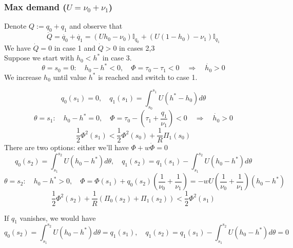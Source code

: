 \documentclass[12pt]{article}
\begin{document}

%

\newpage

\subsubsection*{Max demand ($U = \nu_0 + \nu_1$)}

Denote $ Q := q_0 + q_1 $ and observe that
$$ \dot{Q} = \dot{q_0} + \dot{q_1} = \left( Uh_0 - \nu_0 \right) \mathbb{I}_{q_0} +  \left( U(1-h_0) - \nu_1 \right) \mathbb{I}_{q_1} $$
We have $\dot{Q} = 0$ in case 1 and $ \dot{Q} > 0$ in cases 2,3
\\
Suppose we start with $h_0 < h^*$ in case 3. 
$$ \theta = s_0 = 0: \quad h_0 - h^* < 0, \quad \Phi = \tau_0 - \tau_1 < 0 \quad \Rightarrow \quad \dot{h_0} > 0 $$
We increase $h_0$ until value $h^*$ is reached and switch to case 1. 

$$ q_0(s_1) = 0, \quad q_1(s_1) = \int_{s_0}^{s_1}  U(h^*-h_0) d \theta $$
$$ \theta = s_1: \quad h_0 - h^* = 0, \quad \Phi = \tau_0 - (\tau_1 + \frac{q_1}{\nu_1}) < 0 \quad \Rightarrow \quad \dot{h_0} > 0 $$
$$ \frac{1}{2}\Phi^2(s_1) < \frac{1}{2}\Phi^2(s_0) + \frac{1}{R} \Pi_1(s_0) $$
There are two options: either we'll have $\Phi + w \dot{\Phi} = 0$
$$ q_0(s_2) = \int_{s_1}^{s_2} U(h_0 - h^*)d\theta, \quad q_1(s_2) = q_1(s_1) - \int_{s_1}^{s_2} U(h_0 - h^*)d\theta $$
$$ \theta = s_2: \quad h_0 - h^* > 0, \quad \Phi = \Phi(s_1) + q_0(s_2) \left(\frac{1}{\nu_0} + \frac{1}{\nu_1} \right) = -w U \left(\frac{1}{\nu_0} + \frac{1}{\nu_1} \right) (h_0 - h^*) $$
$$ \frac{1}{2}\Phi^2(s_2) + \frac{1}{R} (\Pi_0(s_2) + \Pi_1(s_2))  < \frac{1}{2}\Phi^2(s_1) $$

If $q_1$ vanishes, we would have
$$ q_0(s_2) = \int_{s_1}^{s_2} U(h_0 - h^*)d\theta = q_1(s_1), \quad q_1(s_2) = q_1(s_1) - \int_{s_1}^{s_2} U(h_0 - h^*)d\theta = 0 $$
\end{document}
